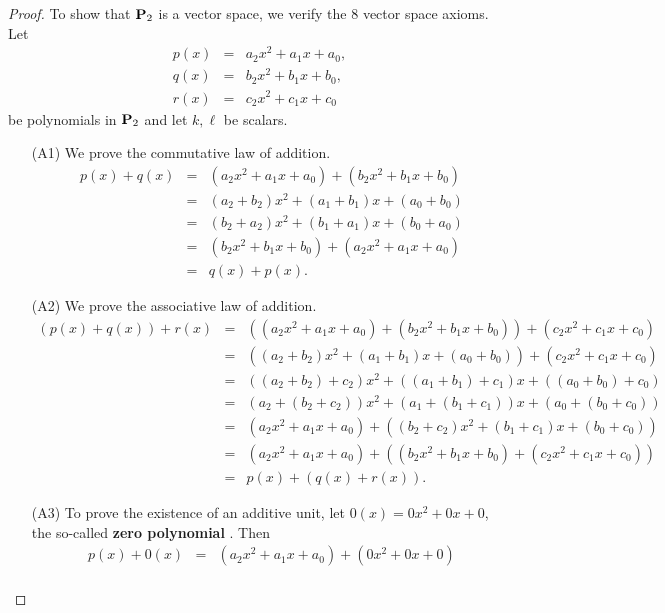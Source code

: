 \begin{proof}
  To show that $\mathbf{P}_2$ is a vector space, we verify the $8$ vector
  space axioms. Let
  \begin{eqnarray*}
    p(x) &=& a_2x^2 + a_1x + a_0, \\
    q(x) &=& b_2x^2 + b_1x + b_0, \\
    r(x) &=& c_2x^2 + c_1x + c_0
  \end{eqnarray*}
  be polynomials in $\mathbf{P}_2$ and let $k,\ell$ be scalars.

  \begin{itemize}
  \item[(A1)] We prove the commutative law of addition.
    \begin{eqnarray*}
      p(x) + q(x)
      &=& (a_2x^2 + a_1x + a_0) + (b_2x^2 + b_1x + b_0) \\
      &=& (a_2 + b_2)x^2 + (a_1 + b_1)x + (a_0 + b_0) \\
      &=& (b_2 + a_2)x^2 + (b_1 + a_1)x + (b_0 + a_0) \\
      &=& (b_2x^2 + b_1x + b_0) + (a_2x^2 + a_1x + a_0) \\
      &=& q(x) + p(x).
    \end{eqnarray*}
  \item[(A2)] We prove the associative law of addition.
    \begin{eqnarray*}
      (p(x) + q(x)) + r(x)
      &=& ((a_2x^2 + a_1x + a_0) + (b_2x^2 + b_1x + b_0)) + (c_2x^2 + c_1x + c_0) \\
      &=& ((a_2 + b_2)x^2 + (a_1 + b_1)x + (a_0 + b_0)) + (c_2x^2 + c_1x + c_0) \\
      &=& ((a_2 + b_2) + c_2)x^2 + ((a_1 + b_1) + c_1)x + ((a_0 + b_0) + c_0) \\
      &=& (a_2 + (b_2 + c_2))x^2 + (a_1 + (b_1 + c_1))x + (a_0 + (b_0 + c_0)) \\
      &=& (a_2x^2 + a_1x + a_0) + ((b_2 + c_2)x^2 + (b_1 + c_1)x + (b_0 + c_0)) \\
      &=& (a_2x^2 + a_1x + a_0) + ((b_2x^2 + b_1x + b_0) + (c_2x^2 + c_1x + c_0)) \\
      &=& p(x) + (q(x) + r(x)).
    \end{eqnarray*}
  \item[(A3)] To prove the existence of an additive unit, let $0(x) =
    0x^2 + 0x + 0$, the so-called \textbf{zero polynomial}%
    . Then
    \begin{eqnarray*}
      p(x) + 0(x)  &=&  (a_2x^2 + a_1x + a_0) + (0x^2 + 0x + 0) \\

\end{eqnarray*}
\end{itemize}
\end{proof}
